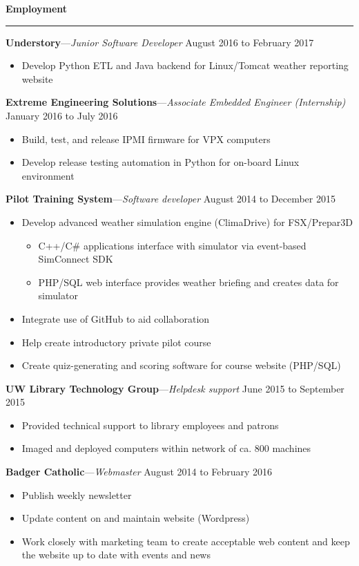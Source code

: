 \documentclass[12pt,letterpaper]{article}
\newenvironment{details}{
    \vspace{-.8em}
    \begin{itemize}
        \renewcommand \labelitemi{\labelitemiv}
        \setlength{\itemsep}{0pt}
        \setlength{\parskip}{-1pt}
        \setlength{\parsep}{0pt}
    }{
    \end{itemize}
    \vspace{-.5em}
}
\newcommand{\hr} {
    \vspace{-1em}
    \par\rule{\textwidth}{1pt}
    \vspace{-1.5em}
}
\newcommand{\ressection}[1] {
    \par{\large \textbf{#1}}
    \hr
}
\newenvironment{employment} {
    \setlength{\parskip}{0pt}
    \ressection{Employment}
}{
    \vspace{0.5em}
}
\newcommand{\employer}[3] {
    \vspace{3pt}
    {\par\textbf{#1}---\textit{#2} \hfill #3}
    \par
}
\begin{document}
\begin{employment} 

\employer{Understory}{Junior Software Developer}{August 2016 to February 2017}
\begin{details}
    \item Develop Python ETL and Java backend for Linux/Tomcat weather reporting website
\end{details}

\employer{Extreme Engineering Solutions}{Associate Embedded Engineer (Internship)}{January 2016 to July 2016}
\begin{details}
    \item Build, test, and release IPMI firmware for VPX computers
    \item Develop release testing automation in Python for on-board Linux environment
\end{details}

\employer{Pilot Training System}{Software developer}{August 2014 to December 2015}
\begin{details}
    \item Develop advanced weather simulation engine (ClimaDrive) for FSX/Prepar3D
    \vspace{.5em}
    \begin{details}
        \item C++/C\# applications interface with simulator via event-based SimConnect SDK
        \item PHP/SQL web interface provides weather briefing and creates data for simulator
    \end{details}
    \item Integrate use of GitHub to aid collaboration
    \item Help create introductory private pilot course
    \item Create quiz-generating and scoring software for course website (PHP/SQL)
\end{details}

\employer{UW Library Technology Group}{Helpdesk support}{June 2015 to September 2015}
\begin{details}
    \item Provided technical support to library employees and patrons
    \item Imaged and deployed computers within network of ca. 800 machines
\end{details}

\employer{Badger Catholic}{Webmaster}{August 2014 to February 2016}
\begin{details}
    \item Publish weekly newsletter
    \item Update content on and maintain website (Wordpress)
    \item Work closely with marketing team to create acceptable web content and keep the website up to date with events and news
\end{details}


\end{employment}
\end{document}
